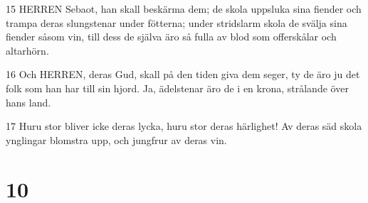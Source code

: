 \par 15 HERREN Sebaot, han skall beskärma dem; de skola uppsluka sina fiender och trampa deras slungstenar under fötterna; under stridslarm skola de svälja sina fiender såsom vin, till dess de själva äro så fulla av blod som offerskålar och altarhörn.
\par 16 Och HERREN, deras Gud, skall på den tiden giva dem seger, ty de äro ju det folk som han har till sin hjord. Ja, ädelstenar äro de i en krona, strålande över hans land.
\par 17 Huru stor bliver icke deras lycka, huru stor deras härlighet! Av deras säd skola ynglingar blomstra upp, och jungfrur av deras vin.

\chapter{10}

